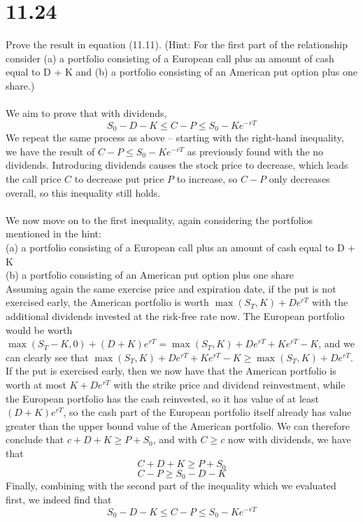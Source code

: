 \documentclass{article}
\begin{document}
{\Large 

\section*{11.24}
Prove the result in equation (11.11). (Hint: For the first part of the relationship consider (a) a portfolio consisting of a European call plus an amount of cash equal to D + K and (b) a portfolio consisting of an American put option plus one share.) \\ \\
We aim to prove that with dividends, 
\[
  S_0 - D - K \leq C - P \leq S_0 - Ke^{-rT}
\]
We repeat the same process as above -- starting with the right-hand inequality, we have the result of \(C-P \leq S_0-Ke^{-rT}\) as previously found with the no dividends. Introducing dividends causes the stock price to decrease, which leads the call price \(C\) to decrease put price \(P\) to increase, so \(C - P\) only decreases overall, so this inequality still holds. \\ \\
We now move on to the first inequality, again considering the portfolios mentioned in the hint: \\
(a) a portfolio consisting of a European call plus an amount of cash equal to D + K \\
(b) a portfolio consisting of an American put option plus one share \\
Assuming again the same exercise price and expiration date, if the put is not exercised early, the American portfolio is worth \(\max(S_T, K) + De^{rT}\) with the additional dividends invested at the risk-free rate now. The European portfolio would be worth \(\max(S_T - K, 0) + (D + K)e^{rT} = \max(S_T, K) + De^{rT} + Ke^{rT} - K\), and we can clearly see that \(\max(S_T, K) + De^{rT} + Ke^{rT} - K \geq \max(S_T, K) + De^{rT}\). \\
If the put is exercised early, then we now have that the American portfolio is worth at most \(K + De^{rT}\) with the strike price and dividend reinvestment, while the European portfolio has the cash reinvested, so it has value of at least \((D + K)e^{rT}\), so the cash part of the European portfolio itself already has value greater than the upper bound value of the American portfolio. We can therefore conclude that \(c + D + K \geq P + S_0\), and with \(C \geq c\) now with dividends, we have that 
\[
  C + D + K \geq P + S_0
\]
\[
  C - P \geq S_0 - D - K
\]
Finally, combining with the second part of the inequality which we evaluated first, we indeed find that 
\[
  S_0 - D - K \leq C - P \leq S_0 - Ke^{-rT}
\]

}
\end{document}
